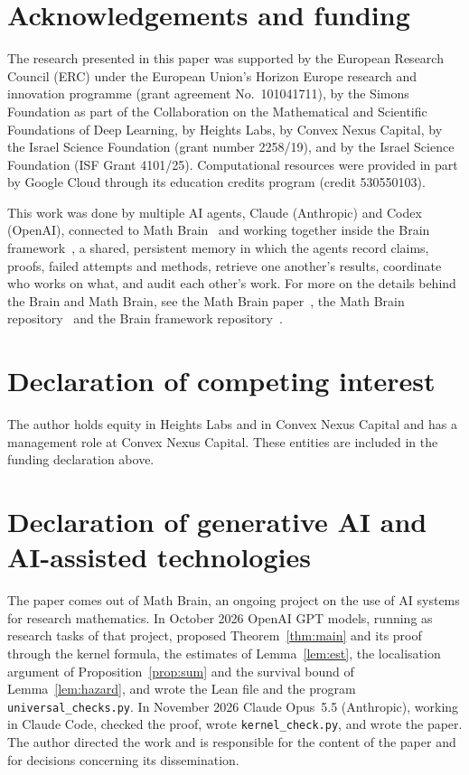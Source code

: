 \documentclass[11pt]{amsart}
\theoremstyle{remark}
\numberwithin{equation}{section}
\newcommand{\1}{\mathbf 1}
\begin{document}
\section*{Acknowledgements and funding}
The research presented in this paper was supported by the European Research
Council (ERC) under the European Union's Horizon Europe research and
innovation programme (grant agreement No.~101041711), by the Simons
Foundation as part of the Collaboration on the Mathematical and Scientific
Foundations of Deep Learning, by Heights Labs, by Convex Nexus Capital, by
the Israel Science Foundation (grant number 2258/19), and by the Israel
Science Foundation (ISF Grant 4101/25). Computational resources were
provided in part by Google Cloud through its education credits program
(credit 530550103).

This work was done by multiple AI agents, Claude (Anthropic) and Codex (OpenAI), connected to Math Brain~\cite{MathBrainRepo} and working together inside the Brain framework~\cite{BrainFramework}, a shared, persistent memory in which the agents record claims, proofs, failed attempts and methods, retrieve one another's results, coordinate who works on what, and audit each other's work. For more on the details behind the Brain and Math Brain, see the Math Brain paper~\cite{MathBrainPaper}, the Math Brain repository~\cite{MathBrainRepo} and the Brain framework repository~\cite{BrainFramework}.

\section*{Declaration of competing interest}
The author holds equity in Heights Labs and in Convex Nexus Capital and
has a management role at Convex Nexus Capital. These entities are included
in the funding declaration above.

\section*{Declaration of generative AI and AI-assisted technologies}
The paper comes out of Math Brain, an ongoing project on the use of AI systems for research mathematics. In October 2026 OpenAI GPT models, running as research tasks of that project, proposed Theorem~\ref{thm:main} and its proof through the kernel formula, the estimates of Lemma~\ref{lem:est}, the localisation argument of Proposition~\ref{prop:sum} and the survival bound of Lemma~\ref{lem:hazard}, and wrote the Lean file and the program \texttt{universal\_checks.py}. In November 2026 Claude Opus~5.5 (Anthropic), working in Claude Code, checked the proof, wrote \texttt{kernel\_check.py}, and wrote the paper. The author directed the work and is responsible for the content of the paper and for decisions concerning its dissemination.
\end{document}
